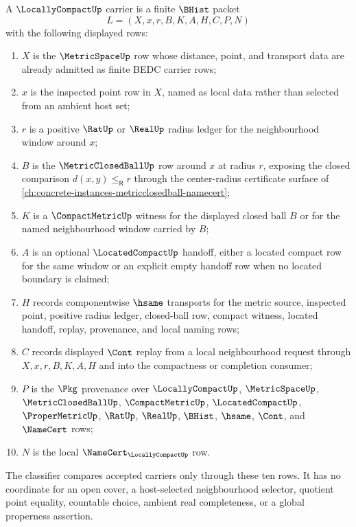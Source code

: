 \begin{definition}
\label{def:locally-compact-carrier}
A $\LocallyCompactUp$ carrier is a finite $\BHist$ packet
$$
L=(X,x,r,B,K,A,H,C,P,N)
$$
with the following displayed rows:
\begin{enumerate}
\item $X$ is the $\MetricSpaceUp$ row whose distance, point, and transport data are already admitted as finite BEDC carrier rows;
\item $x$ is the inspected point row in $X$, named as local data rather than selected from an ambient host set;
\item $r$ is a positive $\RatUp$ or $\RealUp$ radius ledger for the neighbourhood window around $x$;
\item $B$ is the $\MetricClosedBallUp$ row around $x$ at radius $r$, exposing the closed comparison $d(x,y)\leq_{\mathsf R}r$ through the center-radius certificate surface of \autoref{ch:concrete-instances-metricclosedball-namecert};
\item $K$ is a $\CompactMetricUp$ witness for the displayed closed ball $B$ or for the named neighbourhood window carried by $B$;
\item $A$ is an optional $\LocatedCompactUp$ handoff, either a located compact row for the same window or an explicit empty handoff row when no located boundary is claimed;
\item $H$ records componentwise $\hsame$ transports for the metric source, inspected point, positive radius ledger, closed-ball row, compact witness, located handoff, replay, provenance, and local naming rows;
\item $C$ records displayed $\Cont$ replay from a local neighbourhood request through $X,x,r,B,K,A,H$ and into the compactness or completion consumer;
\item $P$ is the $\Pkg$ provenance over $\LocallyCompactUp$, $\MetricSpaceUp$, $\MetricClosedBallUp$, $\CompactMetricUp$, $\LocatedCompactUp$, $\ProperMetricUp$, $\RatUp$, $\RealUp$, $\BHist$, $\hsame$, $\Cont$, and $\NameCert$ rows;
\item $N$ is the local $\NameCert_{\LocallyCompactUp}$ row.
\end{enumerate}
The classifier compares accepted carriers only through these ten rows. It has no coordinate for an open cover, a host-selected neighbourhood selector, quotient point equality, countable choice, ambient real completeness, or a global properness assertion.
\end{definition}

